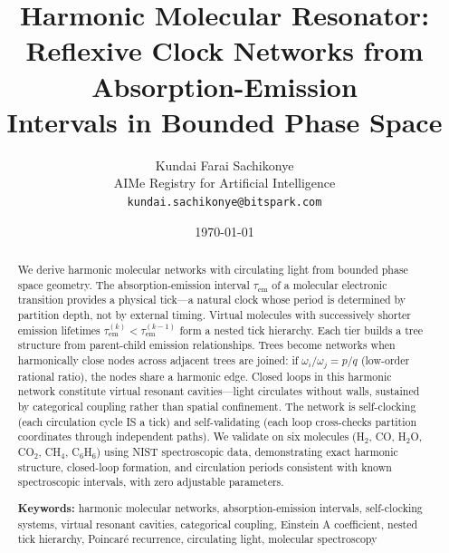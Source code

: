 \documentclass[11pt,twocolumn,a4paper]{article}
\theoremstyle{definition}
\theoremstyle{remark}
\newcommand{\tem}{\tau_{\mathrm{em}}}
\begin{document}
\title{\textbf{Harmonic Molecular Resonator: \\
Reflexive Clock Networks from Absorption-Emission \\
Intervals in Bounded Phase Space}}

\author{
Kundai Farai Sachikonye\\[0.3em]
AIMe Registry for Artificial Intelligence\\[0.3em]
\texttt{kundai.sachikonye@bitspark.com}
}

\date{\today}

\maketitle

\begin{abstract}
We derive harmonic molecular networks with circulating light from bounded phase space geometry. The absorption-emission interval $\tem$ of a molecular electronic transition provides a physical tick---a natural clock whose period is determined by partition depth, not by external timing. Virtual molecules with successively shorter emission lifetimes $\tem^{(k)} < \tem^{(k-1)}$ form a nested tick hierarchy. Each tier builds a tree structure from parent-child emission relationships. Trees become networks when harmonically close nodes across adjacent trees are joined: if $\omega_i/\omega_j = p/q$ (low-order rational ratio), the nodes share a harmonic edge. Closed loops in this harmonic network constitute virtual resonant cavities---light circulates without walls, sustained by categorical coupling rather than spatial confinement. The network is self-clocking (each circulation cycle IS a tick) and self-validating (each loop cross-checks partition coordinates through independent paths). We validate on six molecules (H$_2$, CO, H$_2$O, CO$_2$, CH$_4$, C$_6$H$_6$) using NIST spectroscopic data, demonstrating exact harmonic structure, closed-loop formation, and circulation periods consistent with known spectroscopic intervals, with zero adjustable parameters.

\medskip
\noindent\textbf{Keywords:} harmonic molecular networks, absorption-emission intervals, self-clocking systems, virtual resonant cavities, categorical coupling, Einstein A coefficient, nested tick hierarchy, Poincaré recurrence, circulating light, molecular spectroscopy

\end{abstract}

\end{document}
